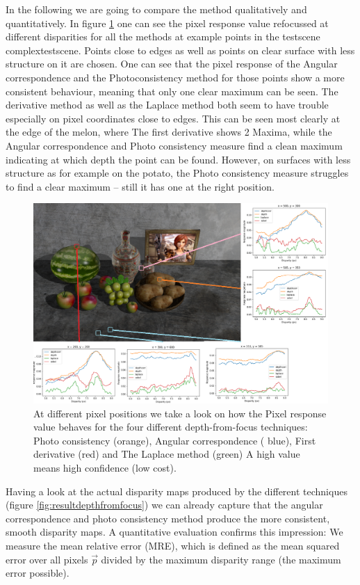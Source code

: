\documentclass  [
  paper    = a4,
  BCOR     = 10mm,
  twoside,
  fontsize = 12pt,
  fleqn,
  toc      = bibnumbered,
  toc      = listofnumbered,
  numbers  = noendperiod,
  headings = normal,
  listof   = leveldown,
  version  = 3.03
]                                       {scrreprt}
\begin{document}
	In the following we are going to compare the method qualitatively and quantitatively. In figure \ref{fig:originalmarked} one can see the pixel response value refocussed at different disparities for all the methods at example points in the testscene \glqq complextestscene\grqq. Points close to edges as well as points on clear surface with less structure on it are chosen. One can see that the pixel response of the Angular correspondence and the Photoconsistency method for those points show a more consistent behaviour, meaning that only one clear maximum can be seen. The derivative method as well as the Laplace method both seem to have trouble especially on pixel coordinates close to edges. This can be seen most clearly at the edge of the melon, where The first derivative shows 2 Maxima, while the Angular correspondence and Photo consistency measure find a clean maximum indicating at which depth the point can be found. However, on surfaces with less structure as for example on the potato, the Photo consistency measure struggles to find a clear maximum -- still it has one at the right position. 
	\begin{figure}
		\centering
		\includegraphics[width=1\linewidth]{images/original_marked}
		\caption[Pixel response for depth from focus techniques]{At different pixel positions we take a look on how the Pixel response value behaves for the four different depth-from-focus techniques: Photo consistency (orange), Angular correspondence ( blue), First derivative (red) and The Laplace method (green) A high value means high confidence (low cost).}
		\label{fig:originalmarked}
	\end{figure}
	Having a look at the actual disparity maps produced by the different techniques (figure \ref{fig:resultdepthfromfocus}) we can already capture that the angular correspondence and photo consistency method produce the more consistent, smooth disparity maps. A quantitative evaluation confirms this impression: We measure the mean relative error (MRE), which is defined as the mean squared error over all pixels $\vec{p}$ divided by the maximum disparity range (the maximum error possible).
\end{document}
